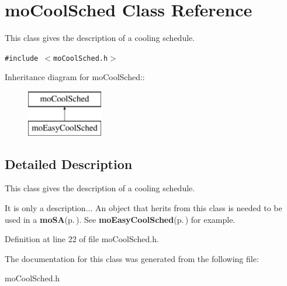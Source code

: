 \section{mo\-Cool\-Sched Class Reference}
\label{classmo_cool_sched}
This class gives the description of a cooling schedule.  


{\tt \#include $<$mo\-Cool\-Sched.h$>$}

Inheritance diagram for mo\-Cool\-Sched::\begin{figure}[H]
\begin{center}
\leavevmode
\includegraphics[height=2cm]{classmo_cool_sched}
\end{center}
\end{figure}


\subsection{Detailed Description}
This class gives the description of a cooling schedule. 

It is only a description... An object that herits from this class is needed to be used in a {\bf mo\-SA}{\rm (p.\,\pageref{classmo_s_a})}. See {\bf mo\-Easy\-Cool\-Sched}{\rm (p.\,\pageref{classmo_easy_cool_sched})} for example. 



Definition at line 22 of file mo\-Cool\-Sched.h.

The documentation for this class was generated from the following file:\begin{CompactItemize}
\item 
mo\-Cool\-Sched.h\end{CompactItemize}
